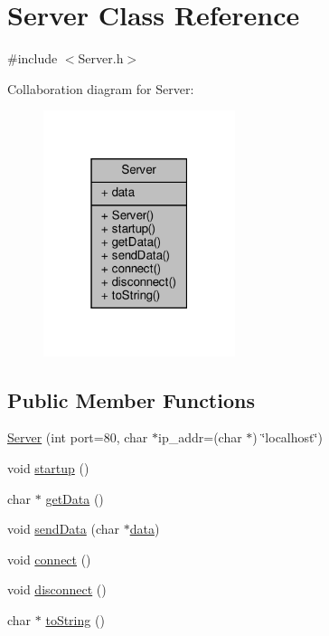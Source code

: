 \hypertarget{classServer}{}\section{Server Class Reference}
\label{classServer}


{\ttfamily \#include $<$Server.\+h$>$}



Collaboration diagram for Server\+:\nopagebreak
\begin{figure}[H]
\begin{center}
\leavevmode
\includegraphics[width=159pt]{classServer__coll__graph}
\end{center}
\end{figure}
\subsection*{Public Member Functions}
\begin{DoxyCompactItemize}
\item 
\hyperlink{classServer_a693b9b86cd9538ff4833a550515cabf8}{Server} (int port=80, char $\ast$ip\+\_\+addr=(char $\ast$) \char`\"{}localhost\char`\"{})
\item 
void \hyperlink{classServer_aaa7517710dd809ba4d965eb83801fd05}{startup} ()
\item 
char $\ast$ \hyperlink{classServer_a6b6c39b02aeae611dcb2a9f2f5a8d801}{get\+Data} ()
\item 
void \hyperlink{classServer_a5061ce779b01e1c5cf8146022db8b08d}{send\+Data} (char $\ast$\hyperlink{classServer_a511bae2c5604c196eb714c798fdf709d}{data})
\item 
void \hyperlink{classServer_a0bd7069e79b4d5268f0947079e1af54a}{connect} ()
\item 
void \hyperlink{classServer_acd0114484495cfd2749816ddb12e4246}{disconnect} ()
\item 
char $\ast$ \hyperlink{classServer_aee9a13517df765d3c085fab605f24be4}{to\+String} ()
\end{DoxyCompactItemize}
